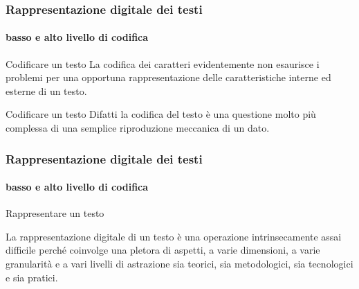 







\begin{frame}
	\frametitle{Rappresentazione digitale dei testi}
	\framesubtitle{basso e alto livello di codifica}
	\addtocounter{nframe}{1}

	\begin{block}{Codificare un testo}
		La codifica dei caratteri evidentemente non esaurisce i problemi per una opportuna rappresentazione delle caratteristiche interne ed esterne di un testo.
    \end{block}
    
    \begin{block}{Codificare un testo}
		Difatti la codifica del testo è una questione molto più complessa di una semplice riproduzione meccanica di un dato.
	\end{block}


\end{frame}


\begin{frame}
	\frametitle{Rappresentazione digitale dei testi}
	\framesubtitle{basso e alto livello di codifica}
	\addtocounter{nframe}{1}

	\begin{block}{Rappresentare un testo}
		
			La rappresentazione digitale di un testo è una operazione intrinsecamente assai difficile perché coinvolge una pletora di aspetti, a varie dimensioni, a varie granularità e a vari livelli di astrazione sia teorici, sia metodologici, sia tecnologici e sia pratici.
		
	\end{block}

\end{frame}

